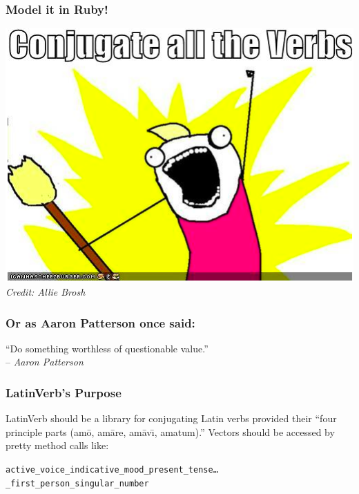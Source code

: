 \documentclass[slidestop,compress,mathserif]{beamer}
\begin{document}
\begin{frame}
	\frametitle{Model it in Ruby!}
	\begin{center}
		\includegraphics[scale=0.45]{img/brosh_all.png}
		\vskip 0.5cm
		\emph{Credit:  Allie Brosh}
	\end{center}
\end{frame}

\begin{frame}
	\frametitle{Or as Aaron Patterson once said:}
	\begin{center}
		``Do something worthless of questionable value.'' \\ -- \emph{Aaron Patterson}
	\end{center}
\end{frame}


\begin{frame}
	\frametitle{LatinVerb's Purpose}
	LatinVerb should be a library for conjugating Latin verbs provided their ``four principle parts (am\={o}, am\={a}re, am\={a}v\={\i}, amatum).''
	\pause
	\vskip 0.5cm
	Vectors should be accessed by pretty method calls like:
	\vskip 0.5cm

	\texttt{active\_voice\_indicative\_mood\_present\_tense{\ldots}\\
	\_first\_person\_singular\_number}

\end{frame}
\end{document}
